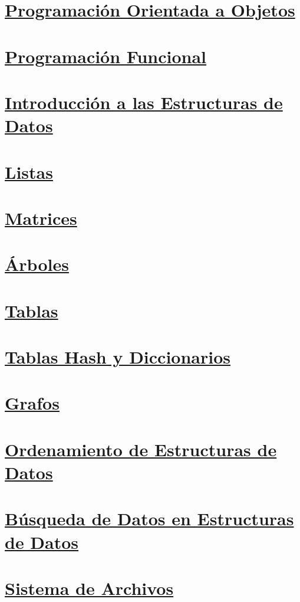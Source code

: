 \documentclass[a4paper, 12pt]{article}
\begin{document}
    \newpage\section*{\textbf{\underline{Programación Orientada a Objetos}}}
    \newpage\section*{\textbf{\underline{Programación Funcional}}}
    \newpage\section*{\textbf{\underline{Introducción a las Estructuras de Datos}}}
    \newpage\section*{\textbf{\underline{Listas}}}
    \newpage\section*{\textbf{\underline{Matrices}}}
    \newpage\section*{\textbf{\underline{Árboles}}}
    \newpage\section*{\textbf{\underline{Tablas}}}
    \newpage\section*{\textbf{\underline{Tablas Hash y Diccionarios}}}
    \newpage\section*{\textbf{\underline{Grafos}}}
    \newpage\section*{\textbf{\underline{Ordenamiento de Estructuras de Datos}}}
    \newpage\section*{\textbf{\underline{Búsqueda de Datos en Estructuras de Datos}}}
    \newpage\section*{\textbf{\underline{Sistema de Archivos}}}
\end{document}
